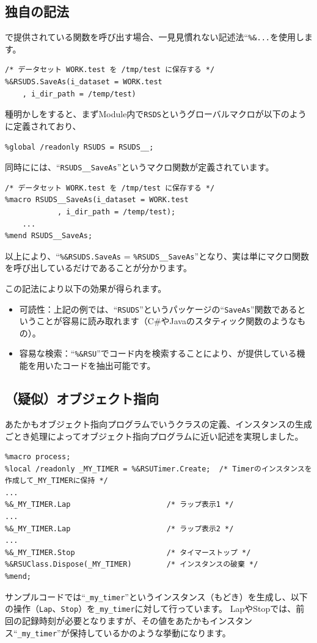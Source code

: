 \subsection{独自の記法}
\RDM で提供されている関数を呼び出す場合、一見見慣れない記述法``\texttt{\%\&...}を使用します。
\begin{lstlisting}
/* データセット WORK.test を /tmp/test に保存する */
%&RSUDS.SaveAs(i_dataset = WORK.test
	, i_dir_path = /temp/test)
\end{lstlisting}
種明かしをすると、まずModule内で\texttt{RSDS}というグローバルマクロが以下のように定義されており、
\begin{center}
\texttt{\%global /readonly RSUDS = RSUDS\_\_;}
\end{center}
同時に\RDM には、``\texttt{RSUDS\_\_SaveAs}''というマクロ関数が定義されています。
\begin{lstlisting}
/* データセット WORK.test を /tmp/test に保存する */
%macro RSUDS__SaveAs(i_dataset = WORK.test
			, i_dir_path = /temp/test);
	...
%mend RSUDS__SaveAs;
\end{lstlisting}
以上により、``\texttt{\%\&RSUDS.SaveAs} = \texttt{\%RSUDS\_\_SaveAs}''となり、実は単にマクロ関数を呼び出しているだけであることが分かります。
 
この記法により以下の効果が得られます。
\begin{itemize}
	\item 可読性：上記の例では、``\texttt{RSUDS}''というパッケージの``\texttt{SaveAs}''関数であるということが容易に読み取れます（C\#やJavaのスタティック関数のようなもの）。
	\item 容易な検索：``\texttt{\%\&RSU}''でコード内を検索することにより、\RDM が提供している機能を用いたコードを抽出可能です。
\end{itemize}
 
\subsection{（疑似）オブジェクト指向}
あたかもオブジェクト指向プログラムでいうクラスの定義、インスタンスの生成ごとき処理によってオブジェクト指向プログラムに近い記述を実現しました。
\begin{lstlisting}
%macro process;
%local /readonly _MY_TIMER = %&RSUTimer.Create;  /* Timerのインスタンスを作成して_MY_TIMERに保持 */
...
%&_MY_TIMER.Lap                      /* ラップ表示1 */
...
%&_MY_TIMER.Lap                      /* ラップ表示2 */
...
%&_MY_TIMER.Stop                     /* タイマーストップ */
%&RSUClass.Dispose(_MY_TIMER)        /* インスタンスの破棄 */
%mend;
\end{lstlisting}
サンプルコードでは``\texttt{\_my\_timer}''というインスタンス（もどき）を生成し、以下の操作（\texttt{Lap}、\texttt{Stop}）を\texttt{\_my\_timer}に対して行っています。
LapやStopでは、前回の記録時刻が必要となりますが、その値をあたかもインスタンス``\texttt{\_my\_timer}''が保持しているかのような挙動になります。
 
